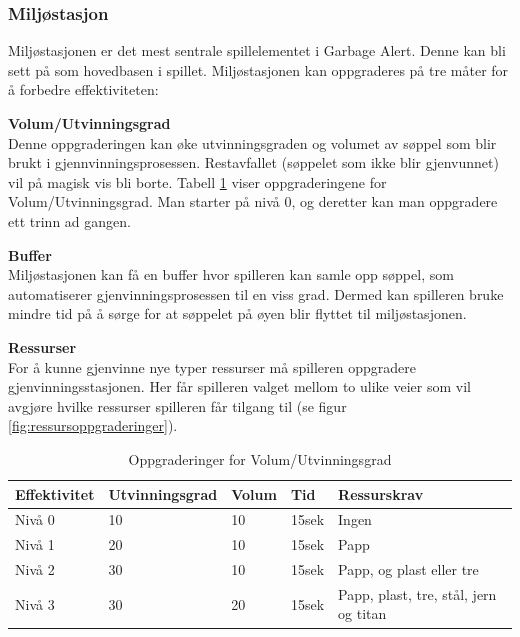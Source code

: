 \subsubsection{Miljøstasjon} \label{miljostasjon}
Miljøstasjonen er det mest sentrale spillelementet i Garbage
Alert. Denne kan bli sett på som hovedbasen i spillet.
Miljøstasjonen kan oppgraderes på tre måter for å forbedre effektiviteten:\\
\begin{description}
	\item \textbf{Volum/Utvinningsgrad}\\Denne oppgraderingen kan øke utvinningsgraden og volumet av søppel som blir brukt i gjennvinningsprosessen. Restavfallet (søppelet som ikke blir gjenvunnet) vil på magisk vis bli borte. Tabell \ref{tab:effektivitet} viser oppgraderingene for Volum/Utvinningsgrad. Man starter på nivå 0, og deretter kan man oppgradere ett trinn ad gangen.
	\item \textbf{Buffer}\\Miljøstasjonen kan få en buffer hvor spilleren kan samle opp søppel, som automatiserer gjenvinningsprosessen til en viss grad. Dermed kan spilleren bruke mindre tid på å sørge for at søppelet på øyen blir flyttet til miljøstasjonen.
	\item \textbf{Ressurser}\\For å kunne gjenvinne nye typer ressurser må
		spilleren oppgradere gjenvinningsstasjonen. Her får spilleren valget
		mellom to ulike veier som vil avgjøre hvilke ressurser spilleren får
		tilgang til (se figur \ref{fig:ressursoppgraderinger}).
\end{description}

\begin{table} \label{tab:effektivitet}
\begin{tabular}[\textwidth]{ l  l  p{3cm}  l  p{4cm} } %
\hline
\bf{Effektivitet} & \bf{Utvinningsgrad} & \bf{Volum} & \bf{Tid} & \bf{Ressurskrav} \\
\hline
Nivå 0 & 10 & 10 & 15sek & Ingen  \\
Nivå 1 & 20 & 10 & 15sek & Papp \\
Nivå 2 & 30 & 10 & 15sek & Papp, og plast eller tre \\
Nivå 3 & 30 & 20 & 15sek & Papp, plast, tre, stål, jern og titan \\
\hline
\end{tabular}
\caption{Oppgraderinger for Volum/Utvinningsgrad}
\end{table}




